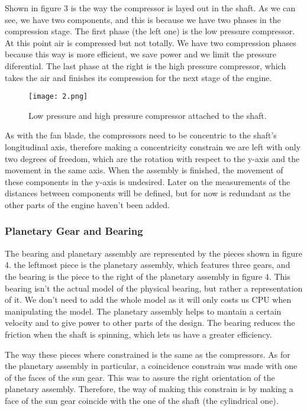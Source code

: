 \documentclass[12pt, letterpaper]{article}
\begin{document}
Shown in figure 3 is the way the compressor is layed out in the shaft. As we can see, we have two components, and this is because we have two phases in the compression stage. The first phase (the left one) is the low pressure compressor. At this point air is compressed but not totally. We have two compression phases because this way is more efficient, we save power and we limit the pressure diferential. The last phase at the right is the high pressure compressor, which takes the air and finishes its compression for the next stage of the engine.


\begin{figure}[H]
	\centering
	\texttt{[image: 2.png]}
	\caption{Low pressure and high pressure compressor attached to the shaft.}
\end{figure}

As with the fan blade, the compressors need to be concentric to the shaft's longitudinal axis, therefore making a concentricity constrain we are left with only two degrees of freedom, which are the rotation with respect to the y-axis and the movement in the same axis. When the assembly is finished, the movement of these components in the y-axis is undesired. Later on the measurements of the distances between components will be defined, but for now is redundant as the other parts of the engine haven't been added.

\subsubsection*{Planetary Gear and Bearing}
The bearing and planetary assembly are represented by the pieces shown in figure 4. the leftmost piece is the planetary assembly, which features three gears, and the bearing is the piece to the right of the planetary assembly in figure 4. This bearing isn't the actual model of the physical bearing, but rather a representation of it. We don't need to add the whole model as it will only costs us CPU when manipulating the model. The planetary assembly helps to mantain a certain velocity and to give power to other parts of the design. The bearing reduces the friction when the shaft is spinning, which lets us have a greater efficiency.

The way these pieces where constrained is the same as the compressors. As for the planetary assembly in particular, a coincidence constrain was made with one of the faces of the sun gear. This was to assure the right orientation of the planetary assembly. Therefore, the way of making this constrain is by making a face of the sun gear coincide with the one of the shaft (the cylindrical one).
\end{document}

